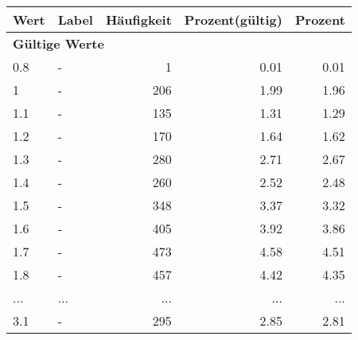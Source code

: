      \begin{longtable}{lXrrr}
     \toprule
     \textbf{Wert} & \textbf{Label} & \textbf{Häufigkeit} & \textbf{Prozent(gültig)} & \textbf{Prozent} \\
     \endhead
     \midrule
     \multicolumn{5}{l}{\textbf{Gültige Werte}}\\
        0.8 & \multicolumn{1}{X}{-} & %
          \num{1} &
          \num[round-mode=places,round-precision=2]{0,01} &
          \num[round-mode=places,round-precision=2]{0,01} \\
        1 & \multicolumn{1}{X}{-} & %
          \num{206} &
          \num[round-mode=places,round-precision=2]{1,99} &
          \num[round-mode=places,round-precision=2]{1,96} \\
        1.1 & \multicolumn{1}{X}{-} & %
          \num{135} &
          \num[round-mode=places,round-precision=2]{1,31} &
          \num[round-mode=places,round-precision=2]{1,29} \\
        1.2 & \multicolumn{1}{X}{-} & %
          \num{170} &
          \num[round-mode=places,round-precision=2]{1,64} &
          \num[round-mode=places,round-precision=2]{1,62} \\
        1.3 & \multicolumn{1}{X}{-} & %
          \num{280} &
          \num[round-mode=places,round-precision=2]{2,71} &
          \num[round-mode=places,round-precision=2]{2,67} \\
        1.4 & \multicolumn{1}{X}{-} & %
          \num{260} &
          \num[round-mode=places,round-precision=2]{2,52} &
          \num[round-mode=places,round-precision=2]{2,48} \\
        1.5 & \multicolumn{1}{X}{-} & %
          \num{348} &
          \num[round-mode=places,round-precision=2]{3,37} &
          \num[round-mode=places,round-precision=2]{3,32} \\
        1.6 & \multicolumn{1}{X}{-} & %
          \num{405} &
          \num[round-mode=places,round-precision=2]{3,92} &
          \num[round-mode=places,round-precision=2]{3,86} \\
        1.7 & \multicolumn{1}{X}{-} & %
          \num{473} &
          \num[round-mode=places,round-precision=2]{4,58} &
          \num[round-mode=places,round-precision=2]{4,51} \\
        1.8 & \multicolumn{1}{X}{-} & %
          \num{457} &
          \num[round-mode=places,round-precision=2]{4,42} &
          \num[round-mode=places,round-precision=2]{4,35} \\
       ... & ... & ... & ... & ... \\
        3.1 & \multicolumn{1}{X}{-} & %
          \num{295} &
          \num[round-mode=places,round-precision=2]{2,85} &
          \num[round-mode=places,round-precision=2]{2,81} \\


\end{longtable}
